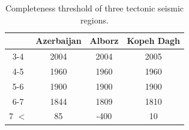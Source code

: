 \begin{table}[h]
\centering
\caption{Completeness threshold of three tectonic seismic regions.}
\begin{tabular}{cccc}
 ~           & Azerbaijan & Alborz & Kopeh Dagh \\ \hline
3-4         & 2004       & 2004   & 2005       \\ \hline
4-5         & 1960       & 1960   & 1960       \\ \hline
5-6         & 1900       & 1900   & 1900       \\ \hline
6-7         & 1844       & 1809   & 1810         \\ \hline
7 $< $    &  85          & -400    & 10         \\ \hline
\end{tabular}
\end{table}

